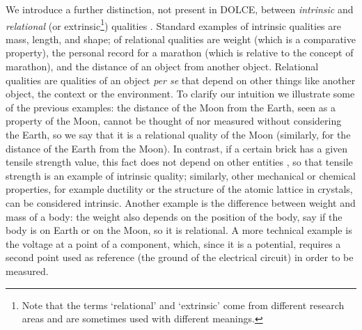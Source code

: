 \documentclass[sw]{iosart2x}
\newcommand{\DOLCE}{\textsc{DOLCE}\xspace} %
\newcommand{\firstTimeKeyWord}[1]{\textit{#1}}
\newcommand{\myComment}[1]{{\unskip \ignorespaces}}
\begin{document}
We \myComment{add} introduce a further distinction, not present in \DOLCE, between \firstTimeKeyWord{intrinsic} and \firstTimeKeyWord{relational} (or extrinsic\footnote{
Note that the terms `relational' and `extrinsic' come from different research areas and are sometimes used with different meanings. %
}) qualities
\cite{sep-intrinsic-extrinsic}. 
Standard examples of intrinsic qualities are mass, length, and shape; %
of relational qualities are weight (which is a comparative property), the personal record for a marathon (which is relative to the concept of marathon), and the distance of an object from another object. %
Relational qualities are \myComment{not} qualities of an object \textit{per se} \myComment{, but} that depend on other things like another object, the context or \myComment{something in} the environment.
To clarify our intuition we illustrate some of the previous examples: the distance of the Moon from the Earth, seen as a property of the Moon, cannot be thought of nor measured without considering the Earth, so we say that it is a relational quality of the Moon (similarly, for the distance of the Earth from the Moon). In contrast, if a certain brick has a given tensile strength value, %
this fact does not depend on other entities%
, so that tensile strength is an example of intrinsic quality; 
similarly, other mechanical or chemical properties, for example ductility or the structure of the atomic lattice in crystals, can be considered intrinsic. 
Another example is the difference between weight and mass of a body: the weight also depends on the position of the body, say if the body is on Earth or on the Moon, so it is relational. 
A more technical example is the voltage at a point of a component, which, since it is a potential, requires a second point used as  reference (the ground of the electrical circuit) in order to be measured. 
\end{document}
